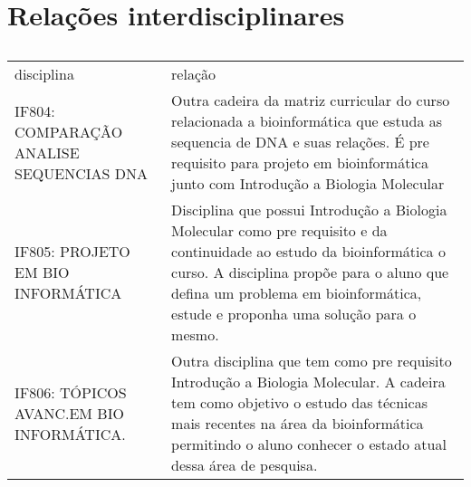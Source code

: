 \documentclass{article}
\begin{document}
\section{Relações interdisciplinares}
\begin{table}[h]
 \centering
 {\renewcommand\arraystretch{1.25}
 \begin{tabular}{ l l }
  \cline{1-1}\cline{2-2}  
    \multicolumn{1}{|p{4.083cm}|}{disciplina} &
    \multicolumn{1}{p{6.050cm}|}{relação}
  \\  
  \cline{1-1}\cline{2-2}  
    \multicolumn{1}{|p{4.083cm}|}{IF804: COMPARAÇÃO ANALISE SEQUENCIAS DNA \centering } &
    \multicolumn{1}{p{6.050cm}|}{Outra cadeira da matriz curricular do curso relacionada a bioinformática que estuda as sequencia de DNA e suas relações. É pre requisito para projeto em bioinformática junto com Introdução a Biologia Molecular}
  \\  
  \cline{1-1}\cline{2-2}  
    \multicolumn{1}{|p{4.083cm}|}{IF805: PROJETO EM BIO INFORMÁTICA \centering } &
    \multicolumn{1}{p{6.050cm}|}{Disciplina que possui Introdução a Biologia Molecular como pre requisito e da continuidade ao estudo da bioinformática o curso. A disciplina propõe para o aluno que defina um problema em bioinformática, estude e proponha uma solução para o mesmo.}
  \\  
  \cline{1-1}\cline{2-2}  
    \multicolumn{1}{|p{4.083cm}|}{IF806: TÓPICOS AVANC.EM BIO INFORMÁTICA. \centering } &
    \multicolumn{1}{p{6.050cm}|}{Outra disciplina que tem como pre requisito Introdução a Biologia Molecular. A cadeira tem como objetivo o estudo das técnicas mais recentes na área da bioinformática permitindo o aluno conhecer o estado atual dessa área de pesquisa.}
  \\  
  \hline
 
 \end{tabular} }
 \caption{\cite{PerfilCurricular}}
\end{table}




\end{document}
